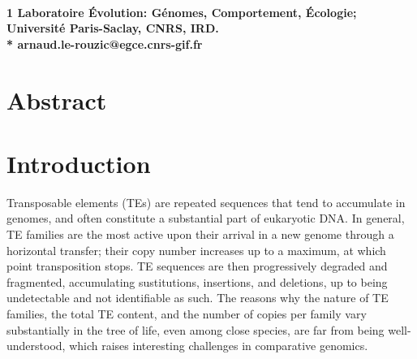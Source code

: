 \documentclass[10pt,a4paper]{article}
\title{}
\date{}
\begin{document}
\vspace*{0.35in}

\begin{flushleft}
{\Large
\textbf{}
}
\newline
\\
\bigskip
\bf{1} Laboratoire Évolution: Génomes, Comportement, Écologie; Université Paris-Saclay, CNRS, IRD.
\\
\bigskip
* arnaud.le-rouzic@egce.cnrs-gif.fr

\end{flushleft}

\section*{Abstract}

\linenumbers

\section{Introduction}

Transposable elements (TEs) are repeated sequences that tend to accumulate in genomes, and often constitute a substantial part of eukaryotic DNA. In general, TE families are the most active upon their arrival in a new genome through a horizontal transfer; their copy number increases up to a maximum, at which point transposition stops. TE sequences are then progressively degraded and fragmented, accumulating sustitutions, insertions, and deletions, up to being undetectable and not identifiable as such. The reasons why the nature of TE families, the total TE content, and the number of copies per family vary substantially in the tree of life, even among close species, are far from being well-understood, which raises interesting challenges in comparative genomics. 
\end{document}
